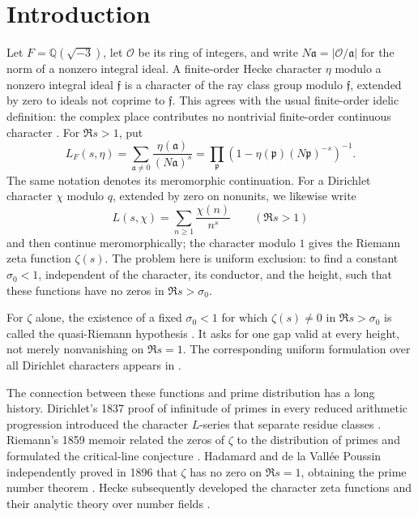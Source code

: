 \begin{abstract}
We prove that all finite-order Hecke $L$-functions over
$\mathbb Q(\sqrt{-3})$ and all Dirichlet $L$-functions are zero-free in
the half-plane $\Re s>7/8$, with the principal pole at $s=1$ allowed.
In particular, the Riemann zeta function is zero-free in this half-plane,
proving the quasi-Riemann hypothesis.
\end{abstract}

\tableofcontents
\clearpage

\section{Introduction}\label{sec:introduction}

Let $F=\mathbb Q(\sqrt{-3})$, let $\mathcal O$ be its ring of integers,
and write $N\mathfrak a=|\mathcal O/\mathfrak a|$ for the norm of a
nonzero integral ideal. A finite-order Hecke character $\eta$ modulo
a nonzero integral ideal $\mathfrak f$ is a character of the ray class group
modulo $\mathfrak f$, extended by zero to ideals not coprime to $\mathfrak f$.
This agrees with the usual finite-order idelic definition: the complex
place contributes no nontrivial finite-order continuous character
\cite[Chapter VI, Section 1]{MilneCFT}. For $\Re s>1$, put
\[
 L_F(s,\eta)=\sum_{\mathfrak a\ne0}
       \frac{\eta(\mathfrak a)}{(N\mathfrak a)^s}
 =\prod_{\mathfrak p}
       \left(1-\eta(\mathfrak p)(N\mathfrak p)^{-s}\right)^{-1}.
\]
The same notation denotes its meromorphic continuation. For a
Dirichlet character $\chi$ modulo $q$, extended by zero on nonunits, we
likewise write
\[
 L(s,\chi)=\sum_{n\ge1}\frac{\chi(n)}{n^s}
 \qquad(\Re s>1)
\]
and then continue meromorphically; the character modulo $1$ gives the
Riemann zeta function $\zeta(s)$. The problem here is uniform exclusion:
to find a constant $\sigma_0<1$, independent of the character, its
conductor, and the height, such that these functions have no zeros in
$\Re s>\sigma_0$.

For $\zeta$ alone, the existence of a fixed $\sigma_0<1$ for which
$\zeta(s)\ne0$ in $\Re s>\sigma_0$ is called the quasi-Riemann
hypothesis \cite[Section 1]{BCSS}. It asks for one gap valid at every
height, not merely nonvanishing on $\Re s=1$. The corresponding uniform
formulation over all Dirichlet characters appears in
\cite[p.~288, Equation (1.4) and the following paragraph]{FG}.

The connection between these functions and prime distribution has a
long history. Dirichlet's 1837 proof of infinitude of primes in every
reduced arithmetic progression introduced the character $L$-series
that separate residue classes \cite{Dirichlet}. Riemann's 1859 memoir
related the zeros of $\zeta$ to the distribution of primes and formulated
the critical-line conjecture \cite{Riemann}. Hadamard and de la
Vall\'ee Poussin independently proved in 1896 that $\zeta$ has no zero
on $\Re s=1$, obtaining the prime number theorem
\cite{Hadamard,ValleePoussin}. Hecke subsequently developed the
character zeta functions and their analytic theory over number fields
\cite{Hecke}.

